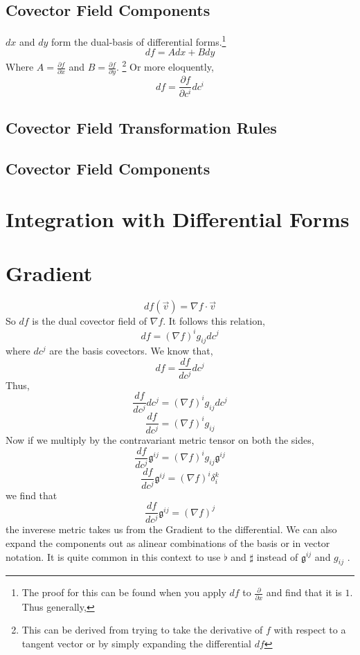 \subsection{Covector Field Components}
$dx$ and $dy$ form the dual-basis of differential forms.\footnote{The proof for this can be found when you apply $df$ to $\frac{\partial}{\partial x}$ and find that it is $1$. Thus generally, }
$$df = A dx + B dy$$
Where $A = \frac{\partial f}{\partial x}$ and $B = \frac{\partial f}{\partial y}$. \footnote{This can be derived from trying to take the derivative of $f$ with respect to a tangent vector or by simply expanding the differential $df$}
Or more eloquently,
$$df = \frac{\partial f}{\partial c^{i}} dc^{i}$$
\subsection{Covector Field Transformation Rules}
\subsection{Covector Field Components}
\section{Integration with Differential Forms}

\section{Gradient}
\begin{equation}
df(\vec{v}) = \nabla f \cdot \vec{v} 
\end{equation}
So $df$ is the dual covector field of $\nabla f$. It follows this relation,
\begin{equation}
df = (\nabla f)^{i} g_{ij}dc^{j} 
\end{equation}
where $dc^{j}$ are the basis covectors. We know that,
$$df = \frac{df}{dc^{j}}dc^{j}$$
Thus,
$$\frac{df}{dc^{j}}dc^{j} = (\nabla f)^{i} g_{ij}dc^{j}$$
\begin{equation}
	\frac{df}{dc^{j}} = (\nabla f)^{i} g_{ij}
\end{equation}
Now if we multiply by the contravariant metric tensor on both the sides,
$$\frac{df}{dc^{j}}\mathfrak{g}^{ij} = (\nabla f)^{i} g_{ij}\mathfrak{g}^{ij}$$
$$\frac{df}{dc^{j}}\mathfrak{g}^{ij} = (\nabla f)^{i} \delta^{k}_{i}$$
we find that
\begin{equation}
	\frac{df}{dc^{j}} \mathfrak{g}^{ij} = (\nabla f)^{j}
\end{equation}
the inverese metric takes us from the Gradient to the differential. We can also expand the components out as alinear combinations of the basis or in vector notation. It is quite common in this context to use $\flat$ and $\sharp$ instead of $\mathfrak{g}^{ij}$ and $g_{ij}$ .
